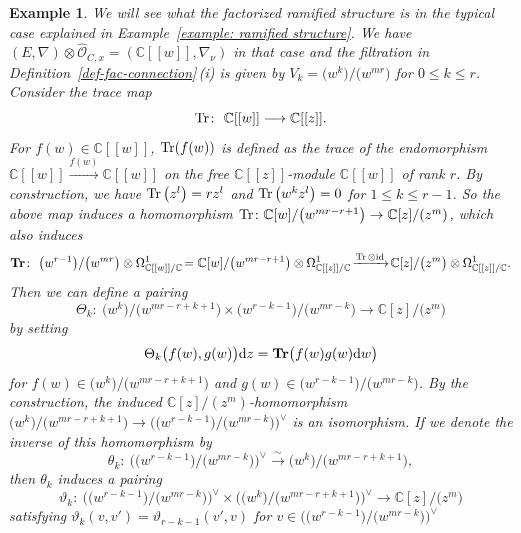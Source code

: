 \documentclass[pdftex]{sigma}
\numberwithin{equation}{section}
\newtheorem{Example}[Theorem]{Example}
\newcommand{\Tr}{\mathop{\rm Tr}\nolimits}
\begin{document}
\begin{Example}\label{example: formal factorized ramified structure}
We will see what the factorized ramified structure is
in the typical case explained in Example~\ref{example: ramified structure}.
We have
$(E,\nabla)\otimes\widehat{\mathcal O}_{C,x}=
(\mathbb{C}[[w]],\nabla_{\nu})$
in that case
and the filtration in Definition~\ref{def-fac-connection}\,(i) is given by
$V_k=\big(w^k\big)/\big(w^{mr}\big)$ for $0\leq k\leq r$.
Consider the trace map
\begin{equation*}
 \Tr \colon \ \mathbb{C}[[w]] \longrightarrow \mathbb{C}[[z]].
\end{equation*}
For
$f(w)\in\mathbb{C}[[w]]$,
$\Tr(f(w))$ is defined as the trace of the endomorphism
$\mathbb{C}[[w]]\xrightarrow{f(w)}\mathbb{C}[[w]]$
on the free $\mathbb{C}[[z]]$-module $\mathbb{C}[[w]]$
of rank $r$.
By construction, we have
$\Tr\big(z^l\big)=rz^l$ and $\Tr\big(w^kz^l\big)=0$ for $1\leq k\leq r-1$.
So the above map induces a homomorphism
$\Tr\colon\mathbb{C}[w]/\big(w^{mr-r+1}\big)
\rightarrow\mathbb{C}[z]/(z^{m})$,
which also induces
\begin{gather*}
 \mathbf{Tr}\colon \
 \big(w^{r-1}\big)/
 \big(w^{mr}\big)\otimes\Omega^1_{\mathbb{C}[[w]]/\mathbb{C}}\!
 =
 \mathbb{C}[w]/\big(w^{mr-r+1}\big)\otimes
 \Omega^1_{\mathbb{C}[[z]]/\mathbb{C}}
 \!\xrightarrow {\Tr\otimes \mathrm{id}}\!
 \mathbb{C}[z]/\big(z^{m}\big)\otimes\Omega^1_{\mathbb{C}[[z]]/\mathbb{C}}.
\end{gather*}
Then we can define a pairing
\[
 \Theta_k\colon \
 \big(w^k\big)/\big(w^{mr-r+k+1}\big) \times \big(w^{r-k-1}\big)/\big(w^{mr-k}\big)
 \longrightarrow \mathbb{C}[z]/\big(z^m\big)
\]
by setting
\[
 \Theta_k \big( f(w),g(w) \big){\rm d}z=\mathbf{Tr} \big( f(w)g(w){\rm d}w \big)
\]
for $f(w)\in \big(w^k\big)/\big(w^{mr-r+k+1}\big)$ and
$g(w)\in \big(w^{r-k-1}\big)/\big(w^{mr-k}\big)$.
By the construction, the induced $\mathbb{C}[z]/(z^m)$-homomorphism
$\big(w^k\big)/\big(w^{mr-r+k+1}\big) \rightarrow
\big(\big(w^{r-k-1}\big)/\big(w^{mr-k}\big)\big)^{\vee}$
is an isomorphism.
If we denote the inverse of this homomorphism by
\[
\theta_k\colon \ \big(\big(w^{r-k-1}\big)/\big(w^{mr-k}\big)\big)^{\vee}
\xrightarrow{\sim}
\big(w^k\big)/\big(w^{mr-r+k+1}\big),
\]
then $\theta_k$ induces a pairing
\[
 \vartheta_k\colon \
 \big(\big(w^{r-k-1}\big)/\big(w^{mr-k}\big)\big)^{\vee} \times \big(\big(w^k\big)/\big(w^{mr-r+k+1}\big)\big)^{\vee}
 \longrightarrow
 \mathbb{C}[z]/\big(z^m\big)
\]
satisfying
$\vartheta_k(v,v')=\vartheta_{r-k-1}(v',v)$
for $v\!\in\! \big(\big(w^{r-k-1}\big)/\big(w^{mr-k}\big)\big)^{\vee}$

\end{Example}
\end{document}
